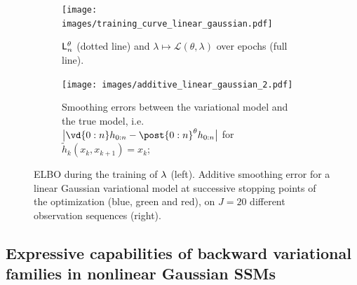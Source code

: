 \documentclass{article}
\begin{document}
\begin{figure}
    \begin{subfigure}{0.5\textwidth}
      \centering
      \texttt{[image: images/training\_curve\_linear\_gaussian.pdf]}
      \caption{$\mathsf{L}_{n}^{\theta}$ (dotted line) and $\lambda \mapsto\mathcal{L}(\theta, \lambda)$ over epochs (full line).}
      \label{fig:linear_gaussian_training_curve}
    \end{subfigure}
    \begin{subfigure}{0.5\textwidth}
      \centering
      \texttt{[image: images/additive\_linear\_gaussian\_2.pdf]}
      \caption{Smoothing errors between the variational model and the true model, i.e. $\big| \vd{0:n} h_{0:n} -  \post{0:n}^{\parvec} h_{0:n} \big|$ for $\tilde{h}_{k}(x_k, x_{k+1}) = x_k$;}
      \label{fig:linear_gaussian_additive_error}
    \end{subfigure}

    \caption{ ELBO during the training of $\lambda$ (left).  Additive smoothing error for a linear Gaussian variational model at successive stopping points of the optimization (blue, green and red), on $J=20$ different observation sequences (right).}
    \label{fig:linear_gaussian}
\end{figure}


\subsection{Expressive capabilities of backward variational families in nonlinear Gaussian SSMs}
\label{sec:experiments:nonlinear}
\end{document}
